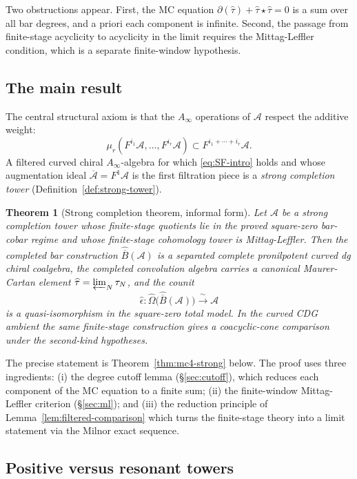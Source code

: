 \documentclass[11pt,reqno]{amsart}
\newtheorem{theorem}{Theorem}[section]
\theoremstyle{definition}
\theoremstyle{remark}
\newcommand{\cA}{\mathcal{A}}
\newcommand{\barB}{\overline{B}}
\newcommand{\Ainf}{A_\infty}
\numberwithin{equation}{section}
\begin{document}
Two obstructions appear. First, the MC equation
$\partial(\widehat\tau) + \widehat\tau \star \widehat\tau = 0$
is a sum over all bar degrees, and a priori each component is
infinite. Second, the passage from finite-stage acyclicity to
acyclicity in the limit requires the Mittag-Leffler condition,
which is a separate finite-window hypothesis.

\subsection{The main result}

The central structural axiom is that the $\Ainf$ operations of
$\cA$ respect the additive weight:
\begin{equation}\label{eq:SF-intro}
\mu_r(F^{i_1}\cA, \dots, F^{i_r}\cA) \subset F^{i_1 + \cdots + i_r}\cA.
\end{equation}
A filtered curved chiral $\Ainf$-algebra for which
\eqref{eq:SF-intro} holds and whose augmentation ideal
$\overline{\cA} = F^1\cA$ is the first filtration piece is a
\emph{strong completion tower}
(Definition~\ref{def:strong-tower}).

\begin{theorem}[Strong completion theorem, informal form]
Let $\cA$ be a strong completion tower whose finite-stage
quotients lie in the proved square-zero bar-cobar regime and whose
finite-stage cohomology tower is Mittag-Leffler. Then the
completed bar construction $\widehat{\barB}(\cA)$ is a
separated complete pronilpotent curved dg chiral coalgebra,
the completed convolution algebra carries a canonical
Maurer-Cartan element $\widehat\tau = \varprojlim_N \tau_N$,
and the counit
\[
\widehat{\epsilon}\colon
\widehat{\Omega}\bigl(\widehat{\barB}(\cA)\bigr)
\xrightarrow{\ \sim\ }\cA
\]
is a quasi-isomorphism in the square-zero total model. In the
curved CDG ambient the same finite-stage construction gives a
coacyclic-cone comparison under the second-kind hypotheses.
\end{theorem}

The precise statement is Theorem~\ref{thm:mc4-strong} below.
The proof uses three ingredients:
(i) the degree cutoff lemma (\S\ref{sec:cutoff}), which reduces
each component of the MC equation to a finite sum;
(ii) the finite-window Mittag-Leffler criterion
(\S\ref{sec:ml}); and (iii) the reduction principle of
Lemma~\ref{lem:filtered-comparison} which turns the finite-stage
theory into a limit statement via the Milnor exact sequence.

\subsection{Positive versus resonant towers}
\end{document}
